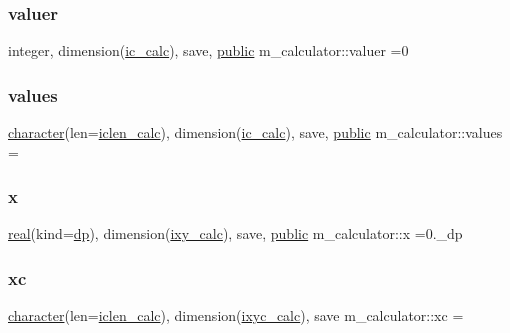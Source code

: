 \subsubsection{\texorpdfstring{valuer}{valuer}}
{\footnotesize\ttfamily integer, dimension(\hyperlink{namespacem__calculator_a462e5bf8d038196149ba96c22a614284}{ic\+\_\+calc}), save, \hyperlink{M__stopwatch_83_8txt_a2f74811300c361e53b430611a7d1769f}{public} m\+\_\+calculator\+::valuer =0}

\mbox{\label{namespacem__calculator_ad2574ef504a32d93ad0c76a9a8e1c626}} 
\subsubsection{\texorpdfstring{values}{values}}
{\footnotesize\ttfamily \hyperlink{option__stopwatch_83_8txt_abd4b21fbbd175834027b5224bfe97e66}{character}(len=\hyperlink{namespacem__calculator_accf705491e8bd9b3d2f0d04fd13712e7}{iclen\+\_\+calc}), dimension(\hyperlink{namespacem__calculator_a462e5bf8d038196149ba96c22a614284}{ic\+\_\+calc}), save, \hyperlink{M__stopwatch_83_8txt_a2f74811300c361e53b430611a7d1769f}{public} m\+\_\+calculator\+::values =\textquotesingle{} \textquotesingle{}}

\mbox{\label{namespacem__calculator_a92431c21aee174f56eab4bd7afbb8aba}} 
\subsubsection{\texorpdfstring{x}{x}}
{\footnotesize\ttfamily \hyperlink{read__watch_83_8txt_abdb62bde002f38ef75f810d3a905a823}{real}(kind=\hyperlink{namespacem__calculator_aefb5a6c3001bb0f09ed82decb6def950}{dp}), dimension(\hyperlink{namespacem__calculator_addb6e867e526d278a9901ef8e7ff8bb6}{ixy\+\_\+calc}), save, \hyperlink{M__stopwatch_83_8txt_a2f74811300c361e53b430611a7d1769f}{public} m\+\_\+calculator\+::x =0.\+\_\+dp}

\mbox{\label{namespacem__calculator_ab41188894b08fea788b696585426ae6b}} 
\subsubsection{\texorpdfstring{xc}{xc}}
{\footnotesize\ttfamily \hyperlink{option__stopwatch_83_8txt_abd4b21fbbd175834027b5224bfe97e66}{character}(len=\hyperlink{namespacem__calculator_accf705491e8bd9b3d2f0d04fd13712e7}{iclen\+\_\+calc}), dimension(\hyperlink{namespacem__calculator_a7f11fbca3121837187391693c8bf3f01}{ixyc\+\_\+calc}), save m\+\_\+calculator\+::xc =\textquotesingle{} \textquotesingle{}\hspace{0.3cm}{\ttfamily [private]}}

